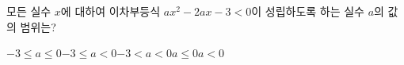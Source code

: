 모든 실수 $x$에 대하여 이차부등식 $ax^2-2ax-3<0$이 성립하도록 하는 실수 $a$의 값의 범위는?
\begin{choicesii}{$-3\le a\le 0$}{$-3\le a<0$}{$-3<a<0$}{$a\le 0$}{$a<0$}\end{choicesii}
